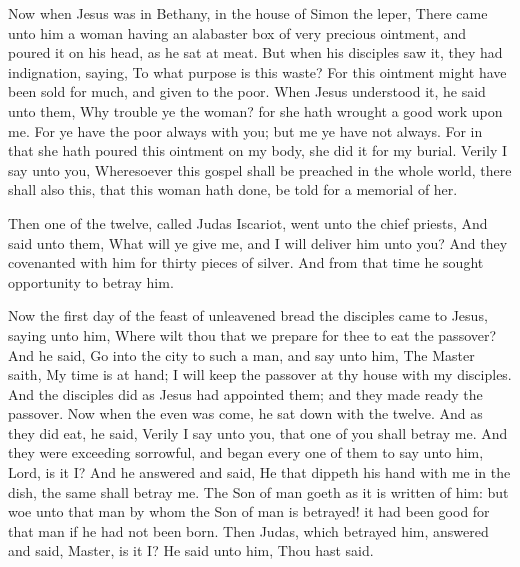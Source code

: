  Now when Jesus was in Bethany, in the house of Simon the
leper,  There came unto him a woman having an alabaster box
of very precious ointment, and poured it on his head, as he sat at meat.
 But when his disciples saw it, they had indignation,
saying, To what purpose is this waste?  For this ointment
might have been sold for much, and given to the poor.  When
Jesus understood it, he said unto them, Why trouble ye the woman? for
she hath wrought a good work upon me.  For ye have the poor
always with you; but me ye have not always.  For in that
she hath poured this ointment on my body, she did it for my burial.
 Verily I say unto you, Wheresoever this gospel shall be
preached in the whole world, there shall also this, that this woman hath
done, be told for a memorial of her.

 Then one of the twelve, called Judas Iscariot, went unto
the chief priests,  And said unto them, What will ye give
me, and I will deliver him unto you? And they covenanted with him for
thirty pieces of silver.  And from that time he sought
opportunity to betray him.

 Now the first day of the feast of unleavened bread the
disciples came to Jesus, saying unto him, Where wilt thou that we
prepare for thee to eat the passover?  And he said, Go into
the city to such a man, and say unto him, The Master saith, My time is
at hand; I will keep the passover at thy house with my disciples.
 And the disciples did as Jesus had appointed them; and
they made ready the passover.  Now when the even was come,
he sat down with the twelve.  And as they did eat, he said,
Verily I say unto you, that one of you shall betray me. 
And they were exceeding sorrowful, and began every one of them to say
unto him, Lord, is it I?  And he answered and said, He that
dippeth his hand with me in the dish, the same shall betray me.
 The Son of man goeth as it is written of him: but woe unto
that man by whom the Son of man is betrayed! it had been good for that
man if he had not been born.  Then Judas, which betrayed
him, answered and said, Master, is it I? He said unto him, Thou hast
said.


